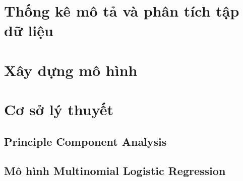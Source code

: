 \documentclass[14pt, a4paper]{article}
\theoremstyle{sltheorem}
\theoremstyle{soltheorem}
\begin{document}
            

            




    \section{Thống kê mô tả và phân tích tập dữ liệu}
    
    

    

    

    \section{Xây dựng mô hình}

    

    

    \section{Cơ sở lý thuyết}

    \subsection{Principle Component Analysis}

    

    \subsection{Mô hình Multinomial Logistic Regression}
\end{document}
